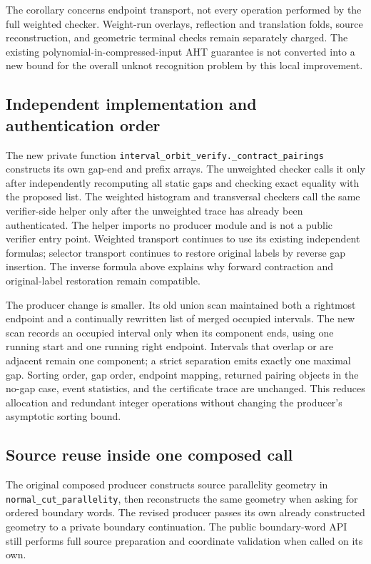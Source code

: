 The corollary concerns endpoint transport, not every operation performed
by the full weighted checker.  Weight-run overlays, reflection and
translation folds, source reconstruction, and geometric terminal checks
remain separately charged.  The existing polynomial-in-compressed-input
AHT guarantee is not converted into a new bound for the overall unknot
recognition problem by this local improvement.

\subsection{Independent implementation and authentication order}

The new private function
\texttt{interval\_orbit\_verify.\_contract\_pairings}
constructs its own gap-end and prefix arrays.  The unweighted checker calls
it only after independently recomputing all static gaps and checking exact
equality with the proposed list.  The weighted histogram and transversal
checkers call the same verifier-side helper only after the unweighted trace
has already been authenticated.  The helper imports no producer module and
is not a public verifier entry point.  Weighted transport continues to use
its existing independent formulas; selector transport continues to restore
original labels by reverse gap insertion.  The inverse formula above
explains why forward contraction and original-label restoration remain
compatible.

The producer change is smaller.  Its old union scan maintained both a
rightmost endpoint and a continually rewritten list of merged occupied
intervals.  The new scan records an occupied interval only when its component
ends, using one running start and one running right endpoint.  Intervals
that overlap or are adjacent remain one component; a strict separation
emits exactly one maximal gap.  Sorting order, gap order, endpoint mapping,
returned pairing objects in the no-gap case, event statistics, and the
certificate trace are unchanged.  This reduces allocation and redundant
integer operations without changing the producer's asymptotic sorting
bound.

\subsection{Source reuse inside one composed call}

The original composed producer constructs source parallelity geometry in
\texttt{normal\_cut\_parallelity}, then reconstructs the same geometry when
asking for ordered boundary words.  The revised producer passes its own
already constructed geometry to a private boundary continuation.  The public
boundary-word API still performs full source preparation and coordinate
validation when called on its own.

